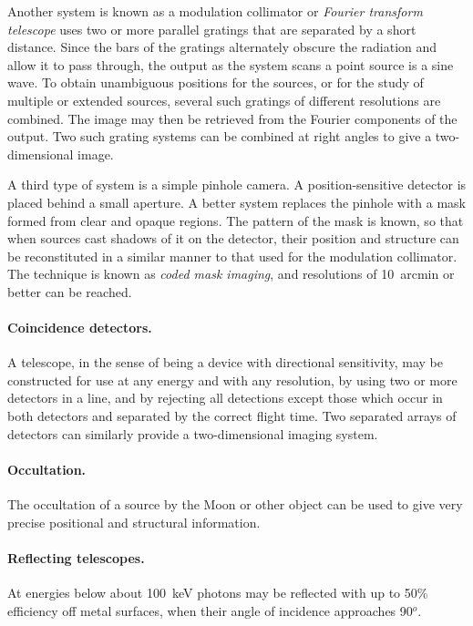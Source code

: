 \documentclass{article}
\begin{document}
Another system is known as a modulation collimator
or {\it Fourier transform telescope} uses two or more parallel gratings that are separated by
a short distance. Since the bars of the gratings alternately obscure the radiation and allow it to 
pass through, the output as the system scans a point source is a sine wave. To obtain 
unambiguous positions for the sources, or for the study of multiple or extended sources, 
several such gratings of different resolutions are combined. The image may then be 
retrieved from the Fourier components of the output. Two such grating systems can be
combined at right angles to give a two-dimensional image. 

A third type of system is a simple pinhole camera. A position-sensitive detector is placed 
behind a small aperture. A better system replaces the pinhole with a mask formed from 
clear and opaque regions. The pattern of the mask is known, so that when sources cast 
shadows of it on the detector, their position and structure can be reconstituted in a similar
manner to that used for the modulation collimator. The technique is known as {\it coded 
mask imaging}, and resolutions of 10~arcmin or better can be reached. 

\paragraph{Coincidence detectors.} A telescope, in the sense of being a device with directional sensitivity, may be constructed for use at any energy and with any resolution, by using two
or more detectors in a line, and by rejecting all detections except those which occur in 
both detectors and separated by the correct flight time. Two separated arrays of detectors 
can similarly provide a two-dimensional imaging system.

\paragraph{Occultation.} The occultation of a source by the Moon or other object can be used to 
give very precise positional and structural information.

\paragraph{Reflecting telescopes.} At energies below about 100~keV photons
may be reflected with up to 50\% efficiency off metal surfaces, when
their angle of incidence approaches 90$^o$.
\end{document}
